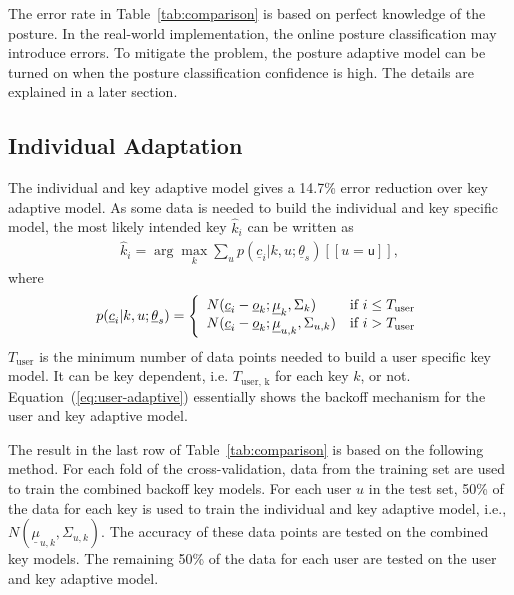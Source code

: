 \documentclass{sigchi}
\begin{document}
The error rate in Table~\ref{tab:comparison} is based on perfect knowledge of
the posture. In the real-world implementation, the online posture classification may
introduce errors. To mitigate the problem, the posture adaptive model can be turned on
when the posture classification confidence is high. The details are explained in a later section.

\subsection{Individual Adaptation}
The individual and key adaptive model gives a 14.7\% error reduction over key adaptive model. As some data is needed to build the individual and key specific model, the most likely intended key $\hat k_i$ can be written as
\begin{align}          
\hat k_i = \arg\max_k \sum_{u} p(\underline c_i | k, u; \underline\theta_s)[[u = \textsf{u}]],
\end{align}
where
\begin{align}
p(\underline c_i | k, u; \underline\theta_s) = \left\{
  \begin{array}{l l}
  N(\underline c_i - \underline o_k; \underline \mu_{k}, \Sigma_{k}) & \text{if $i \le T_\text{user}$} \\
  N(\underline c_i -  \underline o_k; \underline \mu_{u, k}, \Sigma_{u, k}) & \text{if $i >T_\text{user}$} \\
\end{array} \right. \label{eq:user-adaptive}
\end{align}
$T_\text{user}$ is the minimum number of data points needed to build a user specific key model. 
It can be key dependent, i.e. $T_\text{user, k}$ for each key $k$, or not. Equation~(\ref{eq:user-adaptive}) 
essentially shows the backoff mechanism for the user and key adaptive model.

The result in the last row of Table~\ref{tab:comparison} is based on the 
following method. For each fold of the cross-validation, data from the training set are used to 
train the combined backoff key models. For each user $u$ in the test set,
50\% of the data for each key is used to train the individual and key adaptive
model, i.e., $N(\underline \mu_{u, k}, \Sigma_{u, k})$.
The accuracy of these data points are tested on the combined key models.
The remaining 50\% of the data for each user are tested on the user and key adaptive 
model. 
\end{document}
